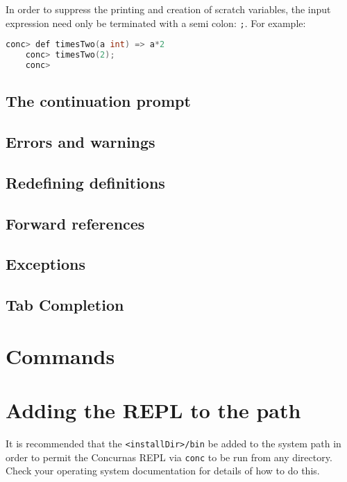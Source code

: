 \documentclass[conc-doc]{subfiles}
\begin{document}
	In order to suppress the printing and creation of scratch variables, the input expression need only be terminated with a semi colon: \lstinline{;}. For example:
	
	\begin{lstlisting}[language=C]
	conc> def timesTwo(a int) => a*2
	conc> timesTwo(2);
	conc> 
	\end{lstlisting}
	
	
	\subsection{The continuation prompt}
	
	
	
	
	
	\subsection{Errors and warnings}
	
	
	\subsection{Redefining definitions}
	
	
	\subsection{Forward references}
	
	\subsection{Exceptions}
	
	\subsection{Tab Completion}
	
	\section{Commands}
	
	
	
	\section{Adding the REPL to the path}
	It is recommended that the \lstinline{<installDir>/bin} be added to the system path in order to permit the Concurnas REPL via \lstinline{conc} to be run from any directory. Check your operating system documentation for details of how to do this.
	
	
	
\end{document}
